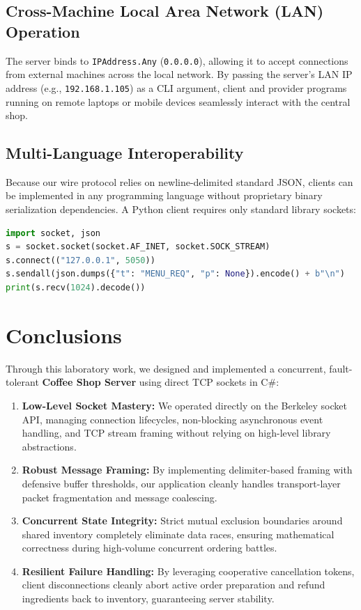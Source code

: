 \documentclass[12pt,a4paper]{article}
\begin{document}
\subsection{Cross-Machine Local Area Network (LAN) Operation}
The server binds to \texttt{IPAddress.Any} (\texttt{0.0.0.0}), allowing it to accept connections from external machines across the local network. By passing the server's LAN IP address (e.g., \texttt{192.168.1.105}) as a CLI argument, client and provider programs running on remote laptops or mobile devices seamlessly interact with the central shop.

\subsection{Multi-Language Interoperability}
Because our wire protocol relies on newline-delimited standard JSON, clients can be implemented in any programming language without proprietary binary serialization dependencies. A Python client requires only standard library sockets:
\begin{lstlisting}[language=Python]
import socket, json
s = socket.socket(socket.AF_INET, socket.SOCK_STREAM)
s.connect(("127.0.0.1", 5050))
s.sendall(json.dumps({"t": "MENU_REQ", "p": None}).encode() + b"\n")
print(s.recv(1024).decode())
\end{lstlisting}

\section{Conclusions}

Through this laboratory work, we designed and implemented a concurrent, fault-tolerant \textbf{Coffee Shop Server} using direct TCP sockets in C\#:
\begin{enumerate}
    \item \textbf{Low-Level Socket Mastery:} We operated directly on the Berkeley socket API, managing connection lifecycles, non-blocking asynchronous event handling, and TCP stream framing without relying on high-level library abstractions.
    \item \textbf{Robust Message Framing:} By implementing delimiter-based framing with defensive buffer thresholds, our application cleanly handles transport-layer packet fragmentation and message coalescing.
    \item \textbf{Concurrent State Integrity:} Strict mutual exclusion boundaries around shared inventory completely eliminate data races, ensuring mathematical correctness during high-volume concurrent ordering battles.
    \item \textbf{Resilient Failure Handling:} By leveraging cooperative cancellation tokens, client disconnections cleanly abort active order preparation and refund ingredients back to inventory, guaranteeing server stability.
\end{enumerate}
\end{document}

